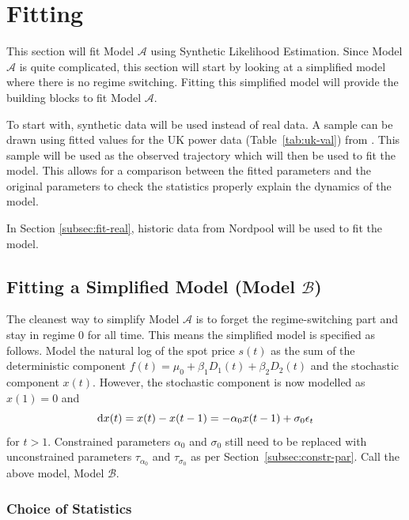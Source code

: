 \section{Fitting}
\label{sec:fitting}
This section will fit Model $\mathcal{A}$ using Synthetic Likelihood Estimation. Since Model $\mathcal{A}$ is quite complicated, this section will start by looking at a simplified model where there is no regime switching. Fitting this simplified model will provide the building blocks to fit Model $\mathcal{A}$.

To start with, synthetic data will be used instead of real data. A sample can be drawn using fitted values  for the UK power data (Table~\ref{tab:uk-val}) from \cite{huisman_mahieu_2003}. This sample will be used as the observed trajectory which will then be used to fit the model. This allows for a comparison between the fitted parameters and the original parameters to check the statistics properly explain the dynamics of the model.

In Section \ref{subsec:fit-real}, historic data from Nordpool will be used to fit the model.

\subsection{Fitting a Simplified Model (Model \texorpdfstring{$\mathcal{B}$}{B})}
The cleanest way to simplify Model $\mathcal{A}$ is to forget the regime-switching part and stay in regime $0$ for all time. This means the simplified model is specified as follows. Model the natural log of the spot price $s(t)$ as the sum of the deterministic component $f(t) = \mu_0 + \beta_1 D_1(t) + \beta_2 D_2(t)$ and the stochastic component $x(t)$. However, the stochastic component is now modelled as $x(1) = 0$ and
\begin{equation}
    \mathop{}\!\mathrm{d}{x(t)} = x(t) - x(t-1) = -\alpha_0 x(t-1) + \sigma_0 \epsilon_t
\end{equation}
for $t > 1$. Constrained parameters $\alpha_0$ and $\sigma_0$ still need to be replaced with unconstrained parameters $\tau_{\alpha_0}$ and $\tau_{\sigma_0}$ as per Section~\ref{subsec:constr-par}. Call the above model, Model $\mathcal{B}$.

\subsubsection{Choice of Statistics}

